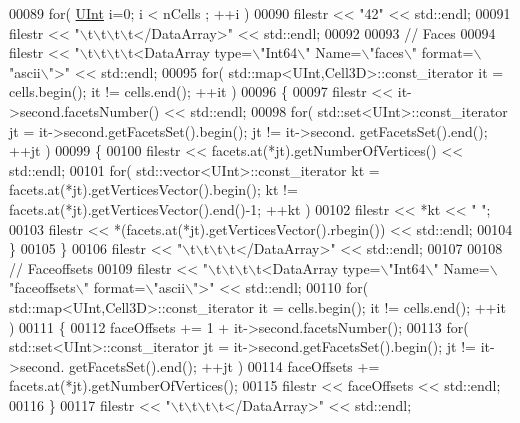 \begin{DoxyCode}
00089     \textcolor{keywordflow}{for}( \hyperlink{namespaceFVCode3D_a4bf7e328c75d0fd504050d040ebe9eda}{UInt} i=0; i < nCells ; ++i )
00090         filestr << \textcolor{stringliteral}{"42"} << std::endl;
00091     filestr << \textcolor{stringliteral}{"\(\backslash\)t\(\backslash\)t\(\backslash\)t\(\backslash\)t</DataArray>"} << std::endl;
00092 
00093     \textcolor{comment}{//  Faces}
00094     filestr << \textcolor{stringliteral}{"\(\backslash\)t\(\backslash\)t\(\backslash\)t\(\backslash\)t<DataArray type=\(\backslash\)"Int64\(\backslash\)" Name=\(\backslash\)"faces\(\backslash\)" format=\(\backslash\)"ascii\(\backslash\)">"} << std::endl;
00095     \textcolor{keywordflow}{for}( std::map<UInt,Cell3D>::const\_iterator it = cells.begin(); it != cells.end(); ++it )
00096     \{
00097         filestr << it->second.facetsNumber() << std::endl;
00098         \textcolor{keywordflow}{for}( std::set<UInt>::const\_iterator jt = it->second.getFacetsSet().begin(); jt != it->second.
      getFacetsSet().end(); ++jt )
00099         \{
00100             filestr << facets.at(*jt).getNumberOfVertices() << std::endl;
00101             \textcolor{keywordflow}{for}( std::vector<UInt>::const\_iterator kt = facets.at(*jt).getVerticesVector().begin(); kt != 
      facets.at(*jt).getVerticesVector().end()-1; ++kt )
00102                 filestr << *kt << \textcolor{stringliteral}{" "};
00103             filestr << *(facets.at(*jt).getVerticesVector().rbegin()) << std::endl;
00104         \}
00105     \}
00106     filestr << \textcolor{stringliteral}{"\(\backslash\)t\(\backslash\)t\(\backslash\)t\(\backslash\)t</DataArray>"} << std::endl;
00107 
00108     \textcolor{comment}{//  Faceoffsets}
00109     filestr << \textcolor{stringliteral}{"\(\backslash\)t\(\backslash\)t\(\backslash\)t\(\backslash\)t<DataArray type=\(\backslash\)"Int64\(\backslash\)" Name=\(\backslash\)"faceoffsets\(\backslash\)" format=\(\backslash\)"ascii\(\backslash\)">"} << std::endl;
00110     \textcolor{keywordflow}{for}( std::map<UInt,Cell3D>::const\_iterator it = cells.begin(); it != cells.end(); ++it )
00111     \{
00112         faceOffsets += 1 + it->second.facetsNumber();
00113         \textcolor{keywordflow}{for}( std::set<UInt>::const\_iterator jt = it->second.getFacetsSet().begin(); jt != it->second.
      getFacetsSet().end(); ++jt )
00114             faceOffsets += facets.at(*jt).getNumberOfVertices();
00115         filestr << faceOffsets << std::endl;
00116     \}
00117     filestr << \textcolor{stringliteral}{"\(\backslash\)t\(\backslash\)t\(\backslash\)t\(\backslash\)t</DataArray>"} << std::endl;

\end{DoxyCode}
